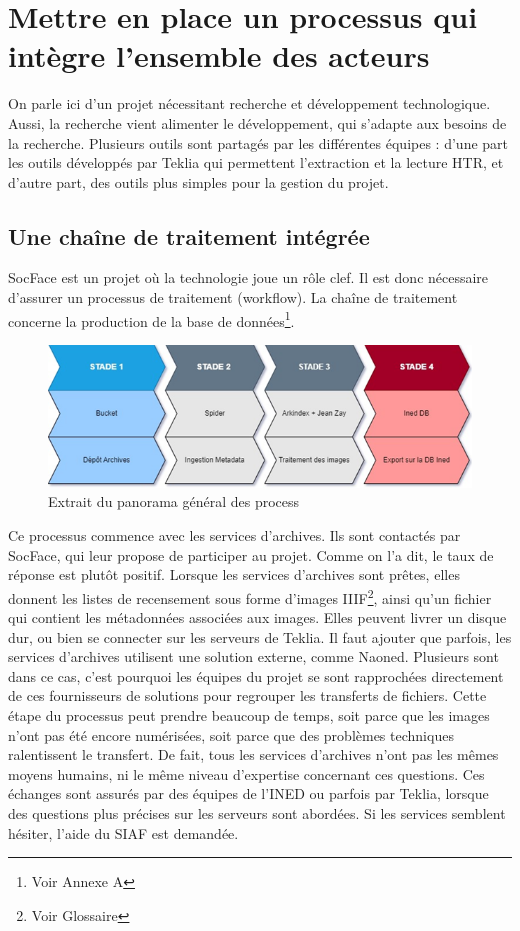 \chapter{Mettre en place un processus qui intègre l’ensemble des acteurs}
On parle ici d’un projet nécessitant recherche et développement technologique. Aussi, la recherche vient alimenter le développement, qui s’adapte aux besoins de la recherche. Plusieurs outils sont partagés par les différentes équipes : d’une part les outils développés par Teklia qui permettent l’extraction et la lecture \gls{HTR}, et d’autre part, des outils plus simples pour la gestion du projet.  

    \section{Une chaîne de traitement intégrée}

SocFace est un projet où la technologie joue un rôle clef. Il est donc nécessaire d’assurer un processus de traitement (workflow). La chaîne de traitement concerne la production de la base de données\footnote{Voir Annexe A}. 

\begin{figure}[H]
        \centering
        \includegraphics[width=1.0\linewidth]{Figures/Partie 1/Fig.1.3 - Extrait du panorama général des process.png}
        \caption[Extrait du panorama général des process]{Extrait du panorama général des process}
        \label{fig:Fig1.3}
    \end{figure}

Ce processus commence avec les services d’archives. Ils sont contactés par SocFace, qui leur propose de participer au projet. Comme on l’a dit, le taux de réponse est plutôt positif. Lorsque les services d'archives sont prêtes, elles donnent les listes de recensement sous forme d’images \gls{IIIF}\footnote{Voir Glossaire}, ainsi qu’un fichier qui contient les métadonnées associées aux images. Elles peuvent livrer un disque dur, ou bien se connecter sur les serveurs de Teklia. Il faut ajouter que parfois, les services d’archives utilisent une solution externe, comme Naoned. Plusieurs sont dans ce cas, c’est pourquoi les équipes du projet se sont rapprochées directement de ces fournisseurs de solutions pour regrouper les transferts de fichiers. Cette étape du processus peut prendre beaucoup de temps, soit parce que les images n’ont pas été encore numérisées, soit parce que des problèmes techniques ralentissent le transfert. De fait, tous les services d’archives n’ont pas les mêmes moyens humains, ni le même niveau d’expertise concernant ces questions. Ces échanges sont assurés par des équipes de l’INED ou parfois par Teklia, lorsque des questions plus précises sur les serveurs sont abordées. Si les services semblent hésiter, l’aide du SIAF est demandée. 


